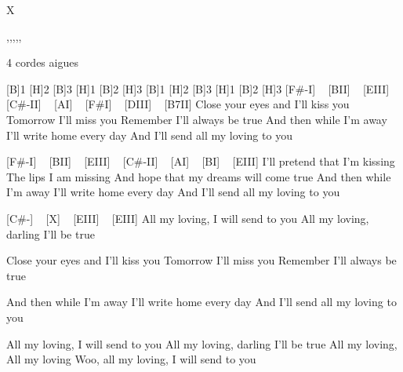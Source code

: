 X
\begin{tabline}{1}{}{}{,,,,,}
\end{tabline}

\begin{guitar}
4 cordes aigues

[B]1 [H]2 [B]3 [H]1 [B]2 [H]3 [B]1 [H]2 [B]3 [H]1 [B]2 [H]3 
[F#-I] ~ [BII] ~ [EIII] ~ [C#-II] ~ [AI] ~ [F#I] ~ [DIII] ~ [B7II]
Close your eyes and I'll kiss you
Tomorrow I'll miss you
Remember I'll always be true
And then while I'm away
I'll write home every day
And I'll send all my loving to you

[F#-I] ~ [BII] ~ [EIII] ~ [C#-II] ~ [AI] ~ [BI] ~ [EIII]
I'll pretend that I'm kissing
The lips I am missing
And hope that my dreams will come true
And then while I'm away
I'll write home every day
And I'll send all my loving to you

[C#-] ~ [X] ~ [EIII] ~ [EIII]
All my loving, I will send to you
All my loving, darling I'll be true

Close your eyes and I'll kiss you
Tomorrow I'll miss you
Remember I'll always be true

And then while I'm away
I'll write home every day
And I'll send all my loving to you

All my loving, I will send to you
All my loving, darling I'll be true
All my loving, All my loving
Woo, all my loving, I will send to you
\end{guitar}

